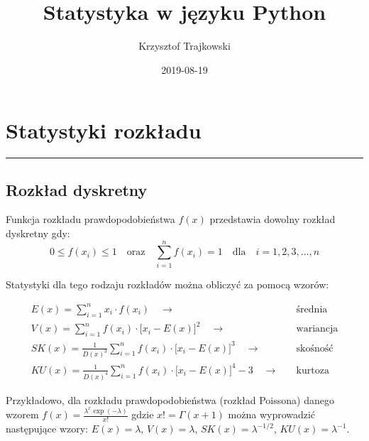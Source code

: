 \documentclass[polish,]{book}
\title{Statystyka w języku Python}
\author{Krzysztof Trajkowski}
\date{2019-08-19}
\begin{document}
\maketitle

{
\hypersetup{linkcolor=black}
\setcounter{tocdepth}{2}
\tableofcontents
}
\hypertarget{R1}{%
\chapter{Statystyki rozkładu}\label{R1}}

\begin{center}\rule{0.5\linewidth}{\linethickness}\end{center}

\hypertarget{R11}{%
\section{Rozkład dyskretny}\label{R11}}

Funkcja rozkładu prawdopodobieństwa \(f(x)\) przedstawia dowolny rozkład dyskretny gdy:
\begin{equation}
0\leq f(x_i)\leq1\quad\textrm{oraz}\quad \sum_{i=1}^{n}f(x_i)=1\quad\textrm{dla}\quad i=1,2,3,\dots,n
\label{eq:prob01}
\end{equation}

Statystyki dla tego rodzaju rozkładów można obliczyć za pomocą wzorów:

\begin{align}
E(x)=\sum_{i=1}^{n}x_i\cdot f(x_i) \quad\longrightarrow\quad
&
\textrm{średnia} \label{eq:Ed}\\[2.5pt]
V(x)=\sum_{i=1}^{n}f(x_i)\cdot \big[x_i-E(x)\big]^2 \quad\longrightarrow\quad
&
\textrm{wariancja} \label{eq:Vd}\\[2.5pt]
SK(x)=\frac{1}{D(x)^3}\sum_{i=1}^{n}f(x_i)\cdot \big[x_i-E(x)\big]^3 \quad\longrightarrow\quad
&
\textrm{skośność} \label{eq:Sd}\\[2.5pt]
KU(x)=\frac{1}{D(x)^4}\sum_{i=1}^{n}f(x_i)\cdot \big[x_i-E(x)\big]^4-3 \quad\longrightarrow\quad
&
\textrm{kurtoza} \label{eq:Kd}
\end{align}

Przykładowo, dla rozkładu prawdopodobieństwa (rozkład Poissona) danego wzorem \(f(x)=\frac{\lambda^x\exp(-\lambda)}{x!}\) gdzie \(x!=\Gamma(x+1)\) można wyprowadzić następujące wzory: \(E(x)= \lambda\), \(V(x)=\lambda\), \(SK(x)=\lambda^{-1/2}\), \(KU(x)=\lambda^{-1}\).
\end{document}
